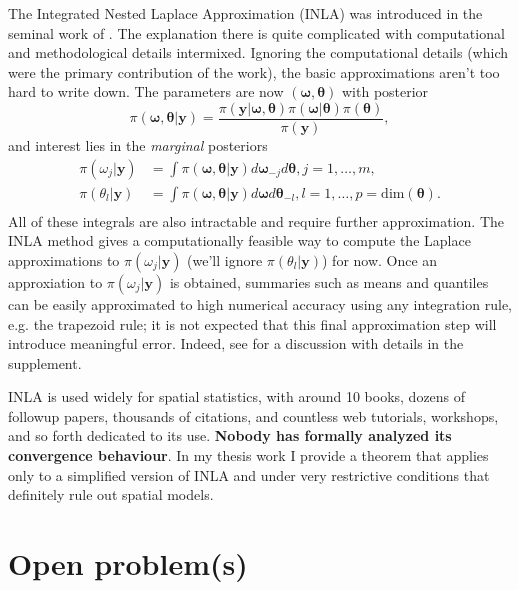 \documentclass[12pt]{article}
\newcommand{\mb}[1]{\boldsymbol{#1}}
\newcommand{\params}{\mb{\theta}}
\newcommand{\response}{\mb{y}}
\begin{document}
The Integrated Nested Laplace Approximation (INLA) was introduced in the seminal work of \citet{rue2009approximate}.
The explanation there is quite complicated with computational and methodological details intermixed. Ignoring the computational
details (which were the primary contribution of the work), the basic approximations aren't too hard to write down.
The parameters are now $(\mb{\omega},\params)$ with posterior
$$
\pi(\mb{\omega},\params|\response) = \frac{\pi(\response|\mb{\omega},\params)\pi(\mb{\omega}|\params)\pi(\params)}{\pi(\response)},
$$
and interest lies in the \emph{marginal} posteriors
\begin{align}\label{eqn:margpost}
\pi(\omega_j | \response) &= \int\pi(\mb{\omega},\params|\response)d\mb{\omega}_{-j}d\params, j = 1,\ldots,m,\\
\pi(\theta_l | \response) &= \int\pi(\mb{\omega},\params|\response)d\mb{\omega}d\params_{-l}, l = 1,\ldots,p=\text{dim}(\params). \\
\end{align}
All of these integrals are also intractable and require further approximation. The INLA method gives a computationally feasible
way to compute the Laplace approximations to $\pi(\omega_j | \response)$ (we'll ignore $\pi(\theta_l | \response)$) for now.
Once an approxiation to $\pi(\omega_j | \response)$ is obtained, summaries such as means and quantiles can be easily approximated
to high numerical accuracy using any integration rule, e.g. the trapezoid rule; it is not expected that this final approximation step 
will introduce meaningful error. Indeed, see \citet{bilodeau2024stochastic} for a discussion with details in the supplement.

INLA is used widely for spatial statistics, with around 10 books, dozens of followup papers, thousands of citations, and countless
web tutorials, workshops, and so forth dedicated to its use. \textbf{Nobody has formally analyzed its convergence behaviour}.
In my thesis work \citep{stringer2023fast} I provide a theorem that applies only to a simplified version of INLA and under very
restrictive conditions that definitely rule out spatial models.

\section{Open problem(s)}
\end{document}
